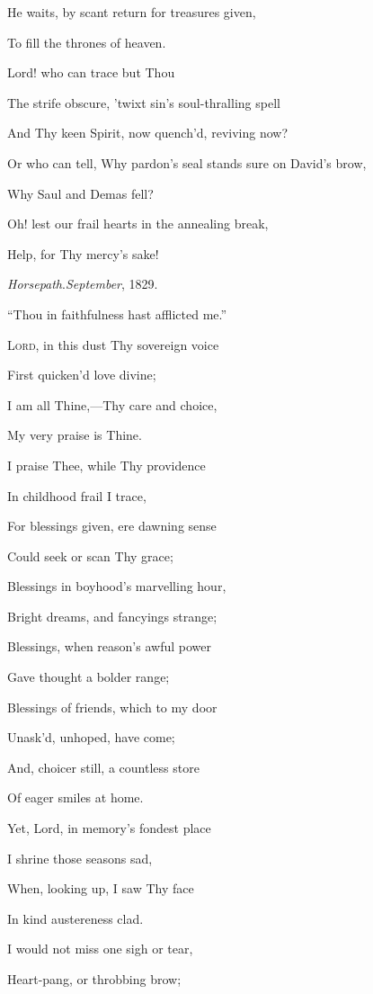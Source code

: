 He waits, by scant return for treasures given,

To fill
the thrones of heaven.

Lord! who
can trace but Thou

The strife obscure, 'twixt sin's soul-thralling spell

And Thy keen Spirit, now quench'd, reviving now?

Or who can tell, Why pardon's seal stands sure on David's brow,

Why
Saul and Demas fell?

Oh! lest our frail hearts in the annealing break,

Help,
for Thy mercy's sake!

\emph{Horsepath}.\emph{September}, 1829.


``Thou in faithfulness hast
afflicted me.''

L\textsc{ord}, in this dust Thy sovereign voice

First quicken'd
love divine;

I am all Thine,—Thy care and choice,

My very praise is
Thine.

I praise Thee, while Thy providence

In childhood frail
I trace,

For blessings given, ere dawning sense

Could seek or scan
Thy grace;

Blessings in boyhood's marvelling hour,

Bright dreams, and
fancyings strange;

Blessings, when reason's awful power

Gave thought a
bolder range; 

Blessings of friends, which to my door

Unask'd, unhoped,
have come;

And, choicer still, a countless store

Of eager smiles at
home.

Yet, Lord, in memory's fondest place

I shrine those
seasons sad,

When, looking up, I saw Thy face

In kind austereness
clad.

I would not miss one sigh or tear,

Heart-pang, or
throbbing brow;

